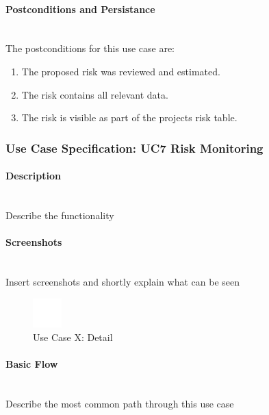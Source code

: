 \paragraph*{Postconditions and Persistance}\mbox{}\\
The postconditions for this use case are:
\begin{enumerate}
	\vspace{-3mm}
	\setlength\itemsep{-1em}
	
	\item The proposed risk was reviewed and estimated. 
	\item The risk contains all relevant data.
	\item The risk is visible as part of the projects risk table.
\end{enumerate}

\newpage
\subsubsection{Use Case Specification: \ac{UC}7 Risk Monitoring}
\label{sec:domainBbh}

\paragraph*{Description}\mbox{}\\
Describe the functionality

\paragraph*{Screenshots}\mbox{}\\
Insert screenshots and shortly explain what can be seen
\begin{figure}[h] 
	\centering
	\includegraphics[width=0.1\textwidth]{Content/Domain/placeholder.png}
	\caption{Use Case X: Detail}
	\label{fig:label7}
\end{figure}

\paragraph*{Basic Flow} \mbox{}\\

Describe the most common path through this use case

